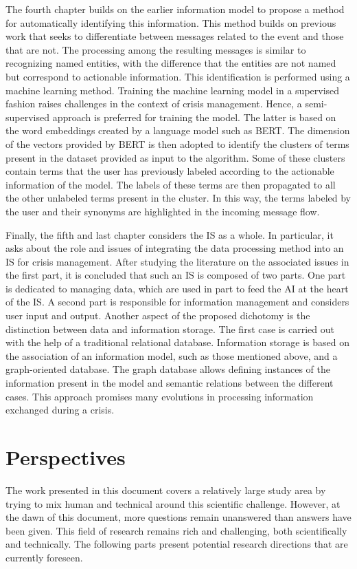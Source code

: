 The fourth chapter builds on the earlier information model to propose a method for automatically identifying this information.
This method builds on previous work that seeks to differentiate between messages related to the event and those that are not.
The processing among the resulting messages is similar to recognizing named entities, with the difference that the entities are not named but correspond to actionable information.
This identification is performed using a machine learning method.
Training the machine learning model in a supervised fashion raises challenges in the context of crisis management.
Hence, a semi-supervised approach is preferred for training the model.
The latter is based on the word embeddings created by a language model such as BERT.
The dimension of the vectors provided by BERT is then adopted to identify the clusters of terms present in the dataset provided as input to the algorithm.
Some of these clusters contain terms that the user has previously labeled according to the actionable information of the model.
The labels of these terms are then propagated to all the other unlabeled terms present in the cluster.
In this way, the terms labeled by the user and their synonyms are highlighted in the incoming message flow.

Finally, the fifth and last chapter considers the IS as a whole.
In particular, it asks about the role and issues of integrating the data processing method into an IS for crisis management.
After studying the literature on the associated issues in the first part, it is concluded that such an IS is composed of two parts.
One part is dedicated to managing data, which are used in part to feed the AI at the heart of the IS.
A second part is responsible for information management and considers user input and output.
Another aspect of the proposed dichotomy is the distinction between data and information storage.
The first case is carried out with the help of a traditional relational database.
Information storage is based on the association of an information model, such as those mentioned above, and a graph-oriented database.
The graph database allows defining instances of the information present in the model and semantic relations between the different cases.
This approach promises many evolutions in processing information exchanged during a crisis.

\section*{Perspectives}
The work presented in this document covers a relatively large study area by trying to mix human and technical around this scientific challenge.
However, at the dawn of this document, more questions remain unanswered than answers have been given.
This field of research remains rich and challenging, both scientifically and technically.
The following parts present potential research directions that are currently foreseen.


